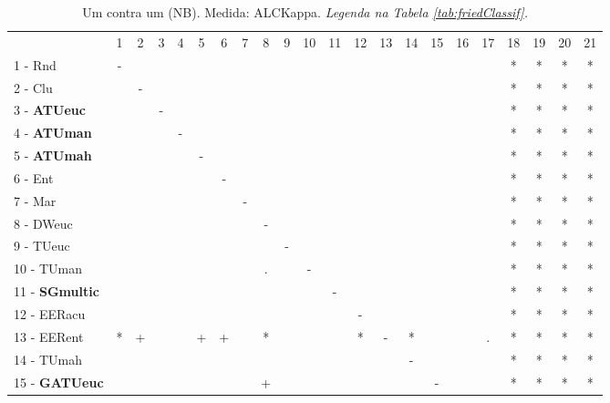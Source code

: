 \begin{table}[h]
\caption{Um contra um (NB). Medida: ALCKappa. \textit{Legenda na Tabela \ref{tab:friedClassif}.}}
\begin{center}\begin{tabular}{lcc|cc|cc|cc|cc|cc|cc|cc|cc|cc|c}
 			& 1 & 2 & 3 & 4 & 5 & 6 & 7 & 8 & 9 & 10 & 11 & 12 & 13 & 14 & 15 & 16 & 17 & 18 & 19 & 20 & 21\\
1 - Rnd  	& - &   &   &   &   &   &   &   &   &   &   &   &   &   &   &   &   & * & * & * & * \\
2 - Clu  	&   & - &   &   &   &   &   &   &   &   &   &   &   &   &   &   &   & * & * & * & * \\ \hline
3 - \textbf{ATUeuc}	&   &   & - &   &   &   &   &   &   &   &   &   &   &   &   &   &   & * & * & * & * \\
4 - \textbf{ATUman}	&   &   &   & - &   &   &   &   &   &   &   &   &   &   &   &   &   & * & * & * & * \\ \hline
5 - \textbf{ATUmah}	&   &   &   &   & - &   &   &   &   &   &   &   &   &   &   &   &   & * & * & * & * \\
6 - Ent  	&   &   &   &   &   & - &   &   &   &   &   &   &   &   &   &   &   & * & * & * & * \\ \hline
7 - Mar  	&   &   &   &   &   &   & - &   &   &   &   &   &   &   &   &   &   & * & * & * & * \\
8 - DWeuc	&   &   &   &   &   &   &   & - &   &   &   &   &   &   &   &   &   & * & * & * & * \\ \hline
9 - TUeuc	&   &   &   &   &   &   &   &   & - &   &   &   &   &   &   &   &   & * & * & * & * \\
10 - TUman	&   &   &   &   &   &   &   & . &   & - &   &   &   &   &   &   &   & * & * & * & * \\ \hline
11 - \textbf{SGmultic}	&   &   &   &   &   &   &   &   &   &   & - &   &   &   &   &   &   & * & * & * & * \\
12 - EERacu	&   &   &   &   &   &   &   &   &   &   &   & - &   &   &   &   &   & * & * & * & * \\ \hline
13 - EERent	& * & + &   &   & + & + &   & * &   &   &   & * & - & * &   &   & . & * & * & * & * \\
14 - TUmah	&   &   &   &   &   &   &   &   &   &   &   &   &   & - &   &   &   & * & * & * & * \\ \hline
15 - \textbf{GATUeuc}	&   &   &   &   &   &   &   & + &   &   &   &   &   &   & - &   &   & * & * & * & * \\

\end{tabular}
\end{center}
\end{table}
